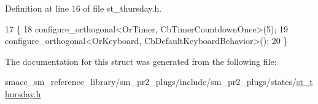 Definition at line 16 of file st\+\_\+thursday.\+h.


\begin{DoxyCode}
17     \{
18         configure\_orthogonal<OrTimer,  CbTimerCountdownOnce>(5);    
19         configure\_orthogonal<OrKeyboard, CbDefaultKeyboardBehavior>();
20     \}
\end{DoxyCode}


The documentation for this struct was generated from the following file\+:\begin{DoxyCompactItemize}
\item 
smacc\+\_\+sm\+\_\+reference\+\_\+library/sm\+\_\+pr2\+\_\+plugs/include/sm\+\_\+pr2\+\_\+plugs/states/\hyperlink{sm__pr2__plugs_2include_2sm__pr2__plugs_2states_2st__thursday_8h}{st\+\_\+thursday.\+h}\end{DoxyCompactItemize}
